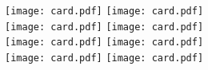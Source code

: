 \documentclass[a4paper]{article}
\begin{document}
    \centering
    \texttt{[image: card.pdf]}
    \texttt{[image: card.pdf]} \\
    \texttt{[image: card.pdf]}
    \texttt{[image: card.pdf]} \\

    \texttt{[image: card.pdf]}
    \texttt{[image: card.pdf]} \\
    \texttt{[image: card.pdf]}
    \texttt{[image: card.pdf]}
\end{document}
